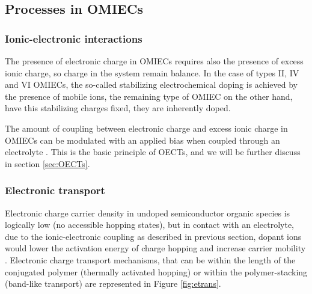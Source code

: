 \subsection{Processes in OMIECs}

\subsubsection{Ionic-electronic interactions}
The presence of electronic charge in OMIECs requires also the presence of excess ionic charge, so charge in the system remain balance. In the case of types II, IV and VI OMIECs, the so-called stabilizing electrochemical doping is achieved by the presence of mobile ions, the remaining type of OMIEC on the other hand, have this stabilizing charges fixed, they are inherently doped.


The amount of coupling between electronic charge and excess ionic charge in OMIECs can be modulated with an applied bias when coupled through an electrolyte \cite{paulsenOrganicMixedIonic2020}. This is the basic principle of OECTs, and we will be further discuss in section \ref{sec:OECTs}.

\subsubsection{Electronic transport}
Electronic charge carrier density in undoped semiconductor organic species is logically low (no accessible hopping states), but in contact with an electrolyte, due to the ionic-electronic coupling as described in previous section, dopant ions would lower the activation energy of charge hopping and increase carrier mobility \cite{paulsenOrganicMixedIonic2020}. Electronic charge transport mechanisms, that can be within the length of the conjugated polymer (thermally activated hopping) or within the polymer-stacking (band-like transport) are represented in Figure \ref{fig:etrans}.



